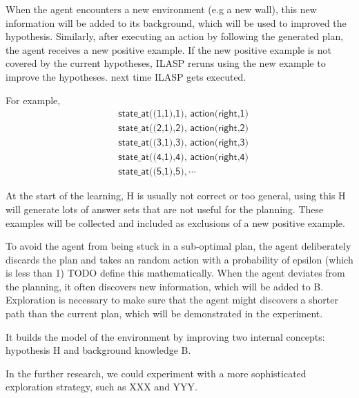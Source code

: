 When the agent encounters a new environment (e.g a new wall), this new information will be added to its background, which will be used to improved the hypothesis. 
Similarly, after executing an action by following the generated plan, the agent receives a new positive example. If the new positive example is not covered by the current hypotheses, 
ILASP reruns using the new example to improve the hypotheses. 
next time ILASP gets executed.

For example,
\begin{equation*}
\begin{split}
&\textsf{state\_at((1,1),1), action(right,1)}\\
&\textsf{state\_at((2,1),2), action(right,2)}\\
&\textsf{state\_at((3,1),3), action(right,3)}\\
&\textsf{state\_at((4,1),4), action(right,4)}\\
&\textsf{state\_at((5,1),5)}, \cdots
\end{split}
\end{equation*}

At the start of the learning, H is usually not correct or too general, using this H will generate lots of answer sets that are not useful for the planning.
These examples will be collected and included as exclusions of a new positive example.

To avoid the agent from being stuck in a sub-optimal plan, the agent deliberately discards the plan and takes an random action with a probability of
epsilon (which is less than 1) TODO define this mathematically.
When the agent deviates from the planning, it often discovers new information, which will be added to B.
Exploration is necessary to make sure that the agent might discovers a shorter path than the current plan, which will be demonstrated in the experiment.

It builds the model of the environment by improving two internal concepts: hypothesis H and background knowledge B.

In the further research, we could experiment with a more sophisticated exploration strategy, such as XXX and YYY.


